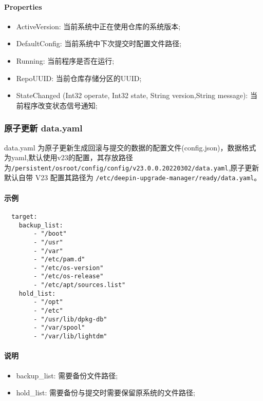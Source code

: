 \documentclass{utart}
\begin{document}
\paragraph{Properties}
\begin{itemize}[leftmargin=4em]
  \item ActiveVersion: 当前系统中正在使用仓库的系统版本;
  \item DefaultConfig: 当前系统中下次提交时配置文件路径;
  \item Running: 当前程序是否在运行;
  \item RepoUUID: 当前仓库存储分区的UUID;
\end{itemize}


\begin{itemize}[leftmargin=4em]
  \item StateChanged (Int32 operate, Int32 state, String version,String message): 当前程序改变状态信号通知;
\end{itemize}

\subsubsection{原子更新 data.yaml}
data.yaml 为原子更新生成回滚与提交的数据的配置文件(config.json)，数据格式为yaml,默认使用v23的配置，其存放路径为\texttt{/persistent/osroot/config/config/v23.0.0.20220302/data.yaml},原子更新默认自带 V23 配置其路径为 \texttt{/etc/deepin-upgrade-manager/ready/data.yaml}。
\paragraph{示例}
\begin{lstlisting}
  target:
    backup_list:
        - "/boot"
        - "/usr"
        - "/var"
        - "/etc/pam.d"
        - "/etc/os-version"
        - "/etc/os-release"
        - "/etc/apt/sources.list"
    hold_list:
        - "/opt"
        - "/etc"
        - "/usr/lib/dpkg-db"
        - "/var/spool"
        - "/var/lib/lightdm"
\end{lstlisting}

\paragraph{说明}
\begin{itemize}[leftmargin=4em]
  \item backup\_list: 需要备份文件路径;
  \item hold\_list: 需要备份与提交时需要保留原系统的文件路径;
\end{itemize}
\end{document}
